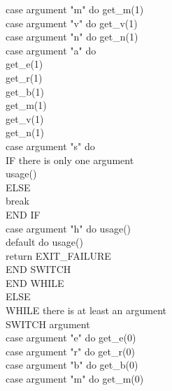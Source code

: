 \documentclass[12pt]{article}
\begin{document}
\indent \indent \indent \indent case argument "m" do get\_m(1) \\
\indent \indent \indent \indent case argument "v" do get\_v(1) \\
\indent \indent \indent \indent case argument "n" do get\_n(1) \\
\indent \indent \indent \indent case argument "a" do \\
\indent \indent \indent \indent \indent get\_e(1) \\
\indent \indent \indent \indent \indent get\_r(1) \\
\indent \indent \indent \indent \indent get\_b(1) \\
\indent \indent \indent \indent \indent get\_m(1) \\
\indent \indent \indent \indent \indent get\_v(1) \\
\indent \indent \indent \indent \indent get\_n(1) \\
\indent \indent \indent \indent case argument "s" do \\
\indent \indent \indent \indent \indent IF there is only one argument \\
\indent \indent \indent \indent \indent \indent usage() \\
\indent \indent \indent \indent \indent ELSE \\
\indent \indent \indent \indent \indent \indent break \\
\indent \indent \indent \indent \indent END IF \\
\indent \indent \indent \indent case argument "h" do usage() \\
\indent \indent \indent \indent default do usage() \\
\indent \indent \indent \indent \indent return EXIT\_FAILURE \\
\indent \indent \indent END SWITCH \\
\indent \indent END WHILE \\
\indent ELSE \\
\indent \indent WHILE there is at least an argument \\
\indent \indent \indent SWITCH argument \\
\indent \indent \indent \indent case argument "e" do get\_e(0) \\
\indent \indent \indent \indent case argument "r" do get\_r(0) \\
\indent \indent \indent \indent case argument "b" do get\_b(0) \\
\indent \indent \indent \indent case argument "m" do get\_m(0) \\
\end{document}
